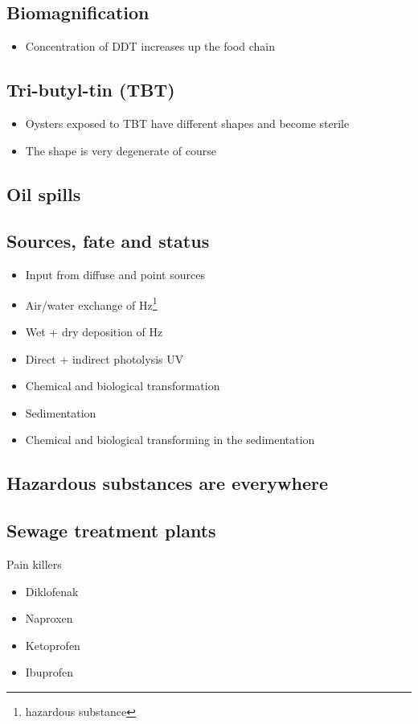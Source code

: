 \subsection{Biomagnification}
\begin{itemize}
	\item Concentration of DDT increases up the food chain
\end{itemize}

\subsection{Tri-butyl-tin (TBT)}

\begin{itemize}
	\item Oysters exposed to TBT have different shapes and become sterile
	\item The shape is very degenerate of course
\end{itemize}

\subsection{Oil spills}

\subsection{Sources, fate and status}
\begin{itemize}
	\item Input from diffuse and point sources
	\item Air/water exchange of Hz\footnote{hazardous substance}
	\item Wet + dry deposition of Hz
	\item Direct + indirect photolysis UV
	\item Chemical and biological transformation
	\item Sedimentation
	\item Chemical and biological transforming in the sedimentation
\end{itemize}

\subsection{Hazardous substances are everywhere}

\subsection{Sewage treatment plants}
Pain killers
\begin{itemize}
	\item Diklofenak
	\item Naproxen
	\item Ketoprofen
	\item Ibuprofen
\end{itemize}

